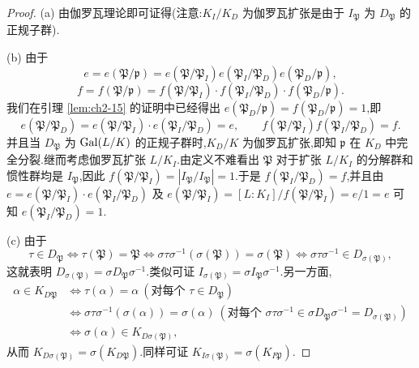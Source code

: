 \begin{proof}
(a) 由伽罗瓦理论即可证得(注意:$K_I/K_D$ 为伽罗瓦扩张是由于 $I_{\mathfrak{P}}$ 为 $D_{\mathfrak{P}}$ 的正规子群).

(b) 由于
\[
  e=e(\mathfrak{P}/\mathfrak{p})=e(\mathfrak{P}/\mathfrak{P}_I)e(\mathfrak{P}_I/\mathfrak{P}_D)e(\mathfrak{P}_D/\mathfrak{p}),
\]
\[
  f=f(\mathfrak{P}/\mathfrak{p})=f(\mathfrak{P}/\mathfrak{P}_I)\cdot f(\mathfrak{P}_I/\mathfrak{P}_D)\cdot f(\mathfrak{P}_D/\mathfrak{p}).
\]
我们在引理 \ref{lem:ch2-15} 的证明中已经得出 $e(\mathfrak{P}_D/\mathfrak{p})=f(\mathfrak{P}_D/\mathfrak{p})=1$,即
\[
  e(\mathfrak{P}/\mathfrak{P}_D)=e(\mathfrak{P}/\mathfrak{P}_I)\cdot e(\mathfrak{P}_I/\mathfrak{P}_D)=e,\qquad
  f(\mathfrak{P}/\mathfrak{P}_I)f(\mathfrak{P}_I/\mathfrak{P}_D)=f.
\]
并且当 $D_{\mathfrak{P}}$ 为 $\operatorname{Gal}(L/K)$ 的正规子群时,$K_D/K$ 为伽罗瓦扩张,即知 $\mathfrak{p}$ 在 $K_D$ 中完全分裂.继而考虑伽罗瓦扩张 $L/K_I$.由定义不难看出 $\mathfrak{P}$ 对于扩张 $L/K_I$ 的分解群和惯性群均是 $I_{\mathfrak{P}}$,因此 $f(\mathfrak{P}/\mathfrak{P}_I)=|I_{\mathfrak{P}}/I_{\mathfrak{P}}|=1$.于是 $f(\mathfrak{P}_I/\mathfrak{P}_D)=f$,并且由 $e=e(\mathfrak{P}/\mathfrak{P}_I)\cdot e(\mathfrak{P}_I/\mathfrak{P}_D)$ 及 $e(\mathfrak{P}/\mathfrak{P}_I)=[L:K_I]/f(\mathfrak{P}/\mathfrak{P}_I)=e/1=e$ 可知 $e(\mathfrak{P}_I/\mathfrak{P}_D)=1$.

(c) 由于
\[
  \tau\in D_{\mathfrak{P}}\Leftrightarrow\tau(\mathfrak{P})=\mathfrak{P}
  \Leftrightarrow\sigma\tau\sigma^{-1}(\sigma(\mathfrak{P}))=\sigma(\mathfrak{P})
  \Leftrightarrow\sigma\tau\sigma^{-1}\in D_{\sigma(\mathfrak{P})},
\]
这就表明 $D_{\sigma(\mathfrak{P})}=\sigma D_{\mathfrak{P}}\sigma^{-1}$.类似可证 $I_{\sigma(\mathfrak{P})}=\sigma I_{\mathfrak{P}}\sigma^{-1}$.另一方面,
\begin{align*}
  \alpha\in K_{D\mathfrak{P}}
  &\Longleftrightarrow\tau(\alpha)=\alpha\ (\text{对每个 }\tau\in D_{\mathfrak{P}})\\
  &\Longleftrightarrow\sigma\tau\sigma^{-1}(\sigma(\alpha))=\sigma(\alpha)\ (\text{对每个 }\sigma\tau\sigma^{-1}\in\sigma D_{\mathfrak{P}}\sigma^{-1}=D_{\sigma(\mathfrak{P})})\\
  &\Longleftrightarrow\sigma(\alpha)\in K_{D\sigma(\mathfrak{P})},
\end{align*}
从而 $K_{D\sigma(\mathfrak{P})}=\sigma(K_{D\mathfrak{P}})$.同样可证 $K_{I\sigma(\mathfrak{P})}=\sigma(K_{I\mathfrak{P}})$.
\end{proof}

